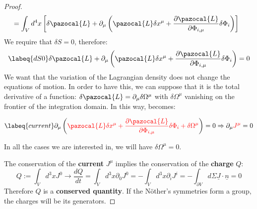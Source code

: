 \documentclass[../main.tex]{subfiles}
\begin{document}
\begin{proof}
\begin{align*}
    &=\int_V d^4x \left[\delta\pazocal{L}+\partial_{\mu}\left(\pazocal{L}\delta x^{\mu}+\frac{\partial\pazocal{L}}{\partial\Phi_{i,\mu}}\delta\Phi_i\right)\right]
\end{align*}
We require that $\delta S=0$, therefore:
\begin{equation}
\labeq{dS0}
\delta\pazocal{L}+\partial_{\mu}\left(\pazocal{L}\delta x^{\mu}+\frac{\partial\pazocal{L}}{\partial\Phi_{i,\mu}}\delta\Phi_i\right)=0
\end{equation}
We want that the variation of the Lagrangian density does not change the equations of motion. In order to have this, we can suppose that it is the total derivative of a function: $\delta\pazocal{L}=\partial_{\mu}\delta\Omega^{\mu}$ with $\delta\Omega^{\mu}$ vanishing on the frontier of the integration domain. In this way,  becomes:
\begin{kaobox}[frametitle=Conserved current]
\begin{equation}
\labeq{current}
\partial_{\mu}\left({\color{red}\pazocal{L}\delta x^{\mu}+\frac{\partial\pazocal{L}}{\partial\Phi_{i,\mu}}\delta\Phi_i+\delta\Omega^{\mu}}\right)=0\Rightarrow\partial_{\mu}{\color{red}J^{\mu}}=0
\end{equation}
\end{kaobox}
In all the cases we are interested in, we will have $\delta\Omega^\mu=0$.

The conservation of the \textbf{current} $J^{\mu}$ implies the conservation of the \textbf{charge} $Q$:
\[
Q:=\int_V d^3x J^0\xrightarrow[]{}\frac{dQ}{dt}=\int_V d^3x\partial_0J^0=-\int_V d^3x\partial_iJ^i=-\int_{\partial V}d\Sigma\underline{J}\cdot\underline{n}=0
\]
Therefore $Q$ is a \textbf{conserved quantity}. If the N\"other's symmetries form a group, the charges will be its generators.
\end{proof}
\end{document}
